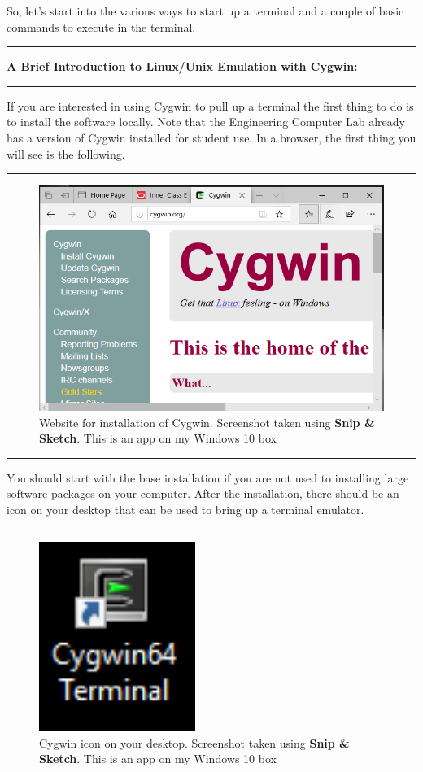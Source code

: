 \documentclass[10pt,fleqn]{article}
\begin{document}
So, let's start into the various ways to start up a terminal and a couple of
basic commands to execute in the terminal.

\vskip0.1in\hrule\vskip0.1in
{\bf A Brief Introduction to Linux/Unix Emulation with Cygwin:}
\vskip0.1in\hrule\vskip0.1in
\noindent
If you are interested in using Cygwin to pull up a terminal the first thing to
do is to install the software locally. Note that the Engineering Computer Lab
already has a version of Cygwin installed for student use. In a browser, the
first thing you will see is the following.
\vskip0.1in\hrule\vskip0.1in
\vfill
\begin{figure}[h]
\centering
\includegraphics[width=6.0in]{../images/cygwin_00.png}
\vskip0.1in
\caption{Website for installation of Cygwin. {Screenshot} taken using
         {\bf Snip \& Sketch}. This is an app on my Windows 10 box}
\end{figure}
\eject
\vskip0.1in\hrule\vskip0.1in
\noindent
You should start with the base installation if you are not used to installing
large software packages on your computer. After the installation, there should
be an icon on your desktop that can be used to bring up a terminal emulator.
\vskip0.1in\hrule\vskip0.1in
\vfill
\begin{figure}[h]
\centering
\includegraphics[width=2.0in]{../images/cygwin_icon.png}
\caption{Cygwin icon on your desktop. {Screenshot} taken using
        {\bf Snip \& Sketch}. This is an app on my Windows 10 box}
\end{figure}
\end{document}
